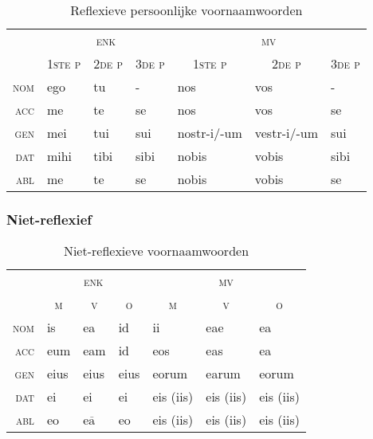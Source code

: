 \documentclass[12pt,a4paper]{article}
\begin{document}
\begin{table}[H]
\centering
\begin{tabular}{ r | l l l | l l l }
\toprule
 & \multicolumn{3}{c|}{\textsc{enk}} & \multicolumn{3}{c}{\textsc{mv}} \\
 & \multicolumn{1}{c}{\textsc{1ste p}} & \multicolumn{1}{c}{\textsc{2de p}} & \multicolumn{1}{c|}{\textsc{3de p}} & \multicolumn{1}{c}{\textsc{1ste p}} & \multicolumn{1}{c}{\textsc{2de p}} & \multicolumn{1}{c}{\textsc{3de p}} \\ 
\midrule
\textsc{nom} & ego  & tu   & -    & nos         & vos          & - \\
\textsc{acc} & me   & te   & se   & nos         & vos          & se \\
\textsc{gen} & mei  & tui  & sui  & nostr-i/-um & vestr-i/-um  & sui \\
\textsc{dat} & mihi & tibi & sibi & nobis       & vobis        & sibi \\
\textsc{abl} & me   & te   & se   & nobis       & vobis        & se \\
\bottomrule
\end{tabular}
\caption{Reflexieve persoonlijke voornaamwoorden}
\label{tab:reflvnw}
\end{table}

\subsubsection{Niet-reflexief}

\begin{table}[H]
\centering
\begin{tabular}{ r | l l l | l l l }
\toprule
 & \multicolumn{3}{c|}{\textsc{enk}} & \multicolumn{3}{c}{\textsc{mv}} \\
 & \multicolumn{1}{c}{\textsc{m}} & \multicolumn{1}{c}{\textsc{v}} & \multicolumn{1}{c|}{\textsc{o}} & \multicolumn{1}{c}{\textsc{m}} & \multicolumn{1}{c}{\textsc{v}} & \multicolumn{1}{c}{\textsc{o}} \\ 
\midrule
\textsc{nom} & is  & ea                     & id & ii    & eae       & ea \\
\textsc{acc} & eum & eam                    & id & eos   & eas       & ea \\
\textsc{gen} & eius   & eius                   & eius  & eorum & earum     & eorum \\
\textsc{dat} & ei   & ei                     & ei  & eis (iis)     & eis (iis) & eis (iis) \\
\textsc{abl} & eo  & e$\overline{\text{a}}$ & eo & eis (iis)     & eis (iis) & eis (iis) \\
\bottomrule
\end{tabular}
\caption{Niet-reflexieve voornaamwoorden}
\label{tab:ntreflvnw}
\end{table}
\end{document}
